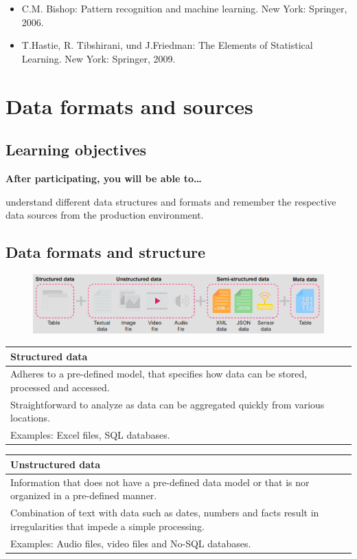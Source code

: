 \documentclass[12pt, a4paper, oneside, justified]{article}
\begin{document}
\begin{itemize}
    \item C.M. Bishop: Pattern recognition and machine learning. New York: Springer, 2006.
    \item T.Hastie, R. Tibshirani, und J.Friedman: The Elements of Statistical Learning. New York: Springer, 2009.
\end{itemize}

\section{Data formats and sources}
\subsection{Learning objectives}

\textbf{After participating, you will be able to…}

understand different data structures and formats and remember the respective data sources from the production environment.

\subsection{Data formats and structure}

\begin{figure}[htbp]
    \centering
    \includegraphics[scale=0.8]{../img/2-1.png}
    \label{img/2-1}
\end{figure}

\begin{table}[!h]
\centering
\begin{tabular}{p{}}
    Structured data \\
    \hline
    Adheres to a pre-defined model, that specifies how data can be stored, processed and accessed. \\
    Straightforward to analyze as data can be aggregated quickly from various locations. \\
    Examples: Excel files, SQL databases.
\end{tabular}
\end{table}

\begin{table}[!h]
\centering
\begin{tabular}{p{}}
    Unstructured data \\
    \hline
    Information that does not have a pre-defined data model or that is nor organized in a pre-defined manner. \\
    Combination of text with data such as dates, numbers and facts result in irregularities that impede a simple  processing. \\
    Examples: Audio files, video files and No-SQL databases.
\end{tabular}
\end{table}
\end{document}
